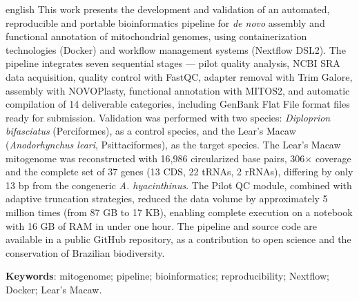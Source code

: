 \documentclass[
    12pt,               %
    openright,          %
    oneside,            %
    a4paper,            %
    chapter=TITLE,      %
    section=TITLE,      %
    english,            %
    brazil,             %
    final               %
]{abntex2}
\begin{document}
\begin{resumo}[Abstract]
    \begin{otherlanguage*}{english}
        This work presents the development and validation of an automated, reproducible and portable bioinformatics pipeline for \textit{de novo} assembly and functional annotation of mitochondrial genomes, using containerization technologies (Docker) and workflow management systems (Nextflow DSL2). The pipeline integrates seven sequential stages --- pilot quality analysis, NCBI SRA data acquisition, quality control with FastQC, adapter removal with Trim Galore, assembly with NOVOPlasty, functional annotation with MITOS2, and automatic compilation of 14 deliverable categories, including GenBank Flat File format files ready for submission. Validation was performed with two species: \textit{Diploprion bifasciatus} (Perciformes), as a control species, and the Lear's Macaw (\textit{Anodorhynchus leari}, Psittaciformes), as the target species. The Lear's Macaw mitogenome was reconstructed with 16,986 circularized base pairs, 306$\times$ coverage and the complete set of 37 genes (13 CDS, 22 tRNAs, 2 rRNAs), differing by only 13 bp from the congeneric \textit{A. hyacinthinus}. The Pilot QC module, combined with adaptive truncation strategies, reduced the data volume by approximately 5 million times (from 87 GB to 17 KB), enabling complete execution on a notebook with 16 GB of RAM in under one hour. The pipeline and source code are available in a public GitHub repository, as a contribution to open science and the conservation of Brazilian biodiversity.

        \vspace{\onelineskip}
        \noindent
        \textbf{Keywords}: mitogenome; pipeline; bioinformatics; reproducibility; Nextflow; Docker; Lear's Macaw.
    \end{otherlanguage*}
\end{resumo}


\end{document}
